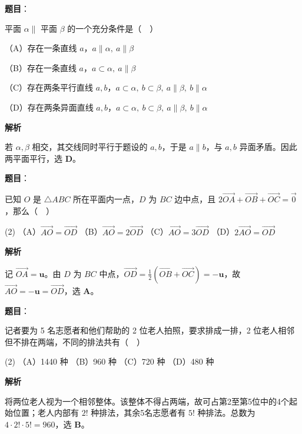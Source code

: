 \begin{answer}

\textbf{题目}：

平面 $\alpha\parallel$ 平面 $\beta$ 的一个充分条件是（　）

（A）存在一条直线 $a$，$a\parallel\alpha,\ a\parallel\beta$

（B）存在一条直线 $a$，$a\subset\alpha,\ a\parallel\beta$

（C）存在两条平行直线 $a,b$，$a\subset\alpha,\ b\subset\beta,\ a\parallel\beta,\ b\parallel\alpha$

（D）存在两条异面直线 $a,b$，$a\subset\alpha,\ b\subset\beta,\ a\parallel\beta,\ b\parallel\alpha$

\textbf{解析}

若 $\alpha,\beta$ 相交，其交线同时平行于题设的 $a,b$，于是 $a\parallel b$，与 $a,b$ 异面矛盾。因此两平面平行，选 \textbf{D}。


\end{answer}
\begin{answer}

\textbf{题目}：

已知 $O$ 是 $\triangle ABC$ 所在平面内一点，$D$ 为 $BC$ 边中点，且
$2\overrightarrow{OA}+\overrightarrow{OB}+\overrightarrow{OC}=\vec{0}$，那么（　）

\begin{gkopts}(2)
\task （A）$\overrightarrow{AO}=\overrightarrow{OD}$
\task （B）$\overrightarrow{AO}=2\overrightarrow{OD}$
\task （C）$\overrightarrow{AO}=3\overrightarrow{OD}$
\task （D）$2\overrightarrow{AO}=\overrightarrow{OD}$
\end{gkopts}

\textbf{解析}

记 $\overrightarrow{OA}=\mathbf u$。由 $D$ 为 $BC$ 中点，$\overrightarrow{OD}=\tfrac12(\overrightarrow{OB}+\overrightarrow{OC})=-\mathbf u$，故 $\overrightarrow{AO}=-\mathbf u=\overrightarrow{OD}$，选 \textbf{A}。


\end{answer}
\begin{answer}

\textbf{题目}：

记者要为 5 名志愿者和他们帮助的 2 位老人拍照，要求排成一排，2 位老人相邻但不排在两端，不同的排法共有（　）

\begin{gkopts}(2)
\task （A）1440 种
\task （B）960 种
\task （C）720 种
\task （D）480 种
\end{gkopts}

\textbf{解析}

将两位老人视为一个相邻整体。该整体不得占两端，故可占第2至第5位中的4个起始位置；老人内部有 $2!$ 种排法，其余5名志愿者有 $5!$ 种排法。总数为 $4\cdot2!\cdot5!=960$，选 \textbf{B}。


\end{answer}
